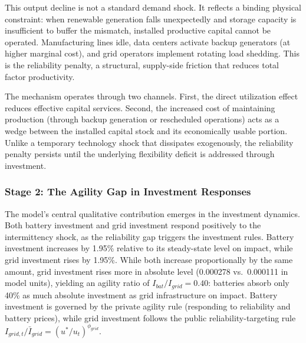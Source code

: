 \documentclass[12pt, a4paper]{article}
\begin{document}
	This output decline is not a standard demand shock. It reflects a binding physical constraint: when renewable generation falls unexpectedly and storage capacity is insufficient to buffer the mismatch, installed productive capital cannot be operated. Manufacturing lines idle, data centers activate backup generators (at higher marginal cost), and grid operators implement rotating load shedding. This is the reliability penalty, a structural, supply-side friction that reduces total factor productivity.
	
	The mechanism operates through two channels. First, the direct utilization effect reduces effective capital services. Second, the increased cost of maintaining production (through backup generation or rescheduled operations) acts as a wedge between the installed capital stock and its economically usable portion. Unlike a temporary technology shock that dissipates exogenously, the reliability penalty persists until the underlying flexibility deficit is addressed through investment.
	
	\subsubsection{Stage 2: The Agility Gap in Investment Responses}
	
	The model's central qualitative contribution emerges in the investment dynamics. Both battery investment and grid investment respond positively to the intermittency shock, as the reliability gap triggers the investment rules. Battery investment increases by 1.95\% relative to its steady-state level on impact, while grid investment rises by 1.95\%. While both increase proportionally by the same amount, grid investment rises more in absolute level (0.000278 vs.\ 0.000111 in model units), yielding an agility ratio of $I_{bat}/I_{grid} = 0.40$: batteries absorb only 40\% as much absolute investment as grid infrastructure on impact. Battery investment is governed by the private agility rule (responding to reliability and battery prices), while grid investment follows the public reliability-targeting rule $I_{grid,t}/\bar{I}_{grid} = (u^*/u_t)^{\phi_{grid}}$.
	
\end{document}
